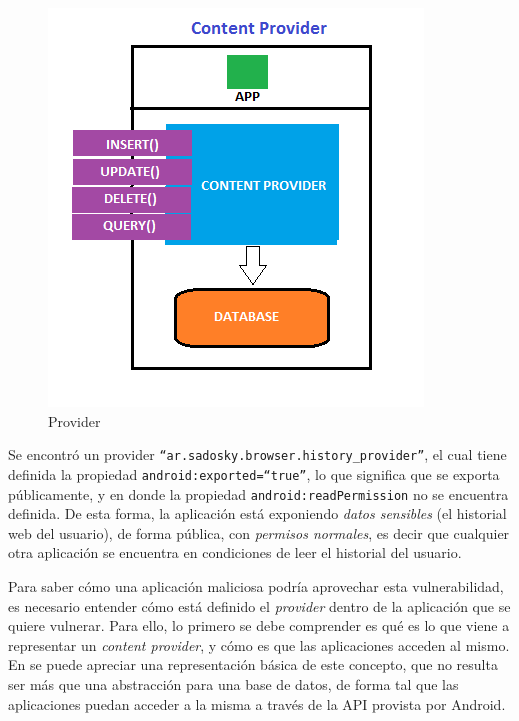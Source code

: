 \documentclass[11pt, a4paper, twoside]{article}
\begin{document}
\begin{figure}
\begin{center}
\includegraphics[scale=0.45]{android-provider.png}
\end{center}
\vspace{-20pt}
\caption{Provider}
\label{fig:android-provider}
\vspace{-30pt}
\end{figure}

Se encontró un provider {\color{blue}\texttt{``ar.sadosky.browser.history\_provider''}}, el cual tiene definida la propiedad \texttt{{\color{red}android:exported}={\color{blue}``true''}}, lo que significa que se exporta públicamente, y en donde la propiedad \texttt{\color{red}android:readPermission} no se encuentra definida. De esta forma, la aplicación está exponiendo \emph{datos sensibles} (el historial web del usuario), de forma pública, con \emph{permisos normales}, es decir que cualquier otra aplicación se encuentra en condiciones de leer el historial del usuario.

Para saber cómo una aplicación maliciosa podría aprovechar esta vulnerabilidad, es necesario entender cómo está definido el \emph{provider} dentro de la aplicación que se quiere vulnerar. Para ello, lo primero se debe comprender es qué es lo que viene a representar un \emph{content provider}, y cómo es que las aplicaciones acceden al mismo. En  se puede apreciar una representación básica de este concepto, que no resulta ser más que una abstracción para una base de datos, de forma tal que las aplicaciones puedan acceder a la misma a través de la API provista por Android.
\end{document}
